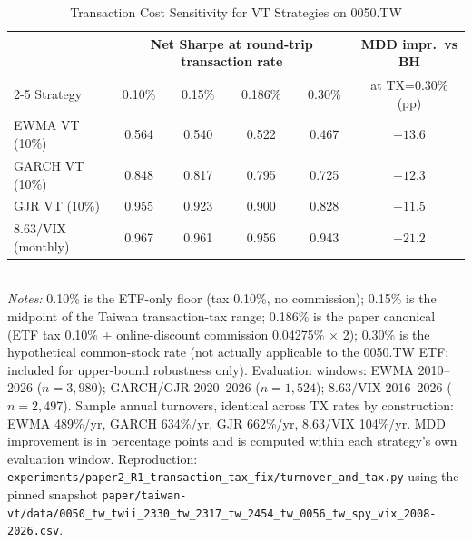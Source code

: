 \begin{table}[!htbp]
\centering
\caption{Transaction Cost Sensitivity for VT Strategies on 0050.TW}
\label{tab:tx_sensitivity}
\small
\begin{tabular}{lccccc}
\toprule
& \multicolumn{4}{c}{Net Sharpe at round-trip transaction rate} & MDD impr.\ vs BH \\
\cmidrule(lr){2-5}
Strategy & 0.10\% & 0.15\% & 0.186\% & 0.30\% & at TX=0.30\% (pp) \\
\midrule
EWMA VT (10\%)        & 0.564 & 0.540 & 0.522 & 0.467 & $+13.6$ \\
GARCH VT (10\%)       & 0.848 & 0.817 & 0.795 & 0.725 & $+12.3$ \\
GJR VT (10\%)         & 0.955 & 0.923 & 0.900 & 0.828 & $+11.5$ \\
$8.63/\text{VIX}$ (monthly) & 0.967 & 0.961 & 0.956 & 0.943 & $+21.2$ \\
\bottomrule
\end{tabular}
\smallskip
\\
\small \textit{Notes:} 0.10\% is the ETF-only floor (tax 0.10\%, no commission); 0.15\%
is the midpoint of the Taiwan transaction-tax range; 0.186\% is the paper canonical (ETF
tax 0.10\% + online-discount commission 0.04275\% $\times$ 2); 0.30\% is the
hypothetical common-stock rate (not actually applicable to the 0050.TW ETF; included
for upper-bound robustness only). Evaluation windows: EWMA 2010--2026
($n=3{,}980$); GARCH/GJR 2020--2026 ($n=1{,}524$); $8.63/\text{VIX}$ 2016--2026
($n=2{,}497$). Sample annual turnovers, identical across TX rates by construction:
EWMA 489\%/yr, GARCH 634\%/yr, GJR 662\%/yr, $8.63/\text{VIX}$ 104\%/yr. MDD improvement
is in percentage points and is computed within each strategy's own evaluation window.
Reproduction: \texttt{experiments/paper2\_R1\_transaction\_tax\_fix/turnover\_and\_tax.py}
using the pinned snapshot \texttt{paper/taiwan-vt/data/0050\_tw\_twii\_2330\_tw\_2317\_tw\_2454\_tw\_0056\_tw\_spy\_vix\_2008-2026.csv}.
\end{table}
